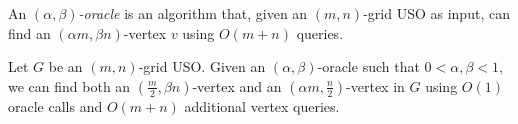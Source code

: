 \documentclass[runningheads,a4paper]{llncs}
\newtheorem{observation}{Observation}
\newcommand{\AT}[1]{\marginpar{\parbox{3.6cm}{{\small {\bf AT:} #1}}}} %
\begin{document}


An \emph{$(\alpha, \beta)$-oracle} is an algorithm that, given an $(m, n)$-grid USO as input, can find an $(\alpha m, \beta n)$-vertex $v$ using $O(m + n)$ queries.

\begin{lemma}\label{lemma:Climbing lemma}
Let $G$ be an $(m,n)$-grid USO.
Given an $(\alpha, \beta)$-oracle such that $0 < \alpha, \beta  < 1$, we can find both an $(\frac{m}{2}, \beta n)$-vertex and an $(\alpha m, \frac{n}{2})$-vertex in $G$ using $O(1)$ oracle calls and $O(m+n)$ additional vertex queries.
\end{lemma}
\end{document}
